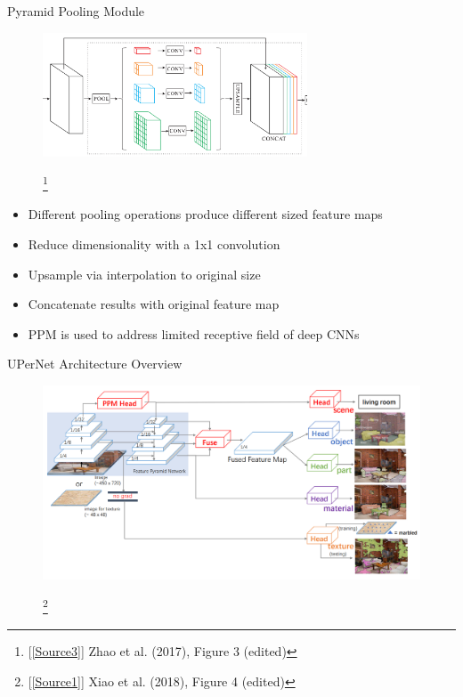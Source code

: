 \documentclass{beamer}
\newcommand\blfootnote[1]{
  \begingroup
  \renewcommand\thefootnote{}\footnote{#1}
  \addtocounter{footnote}{-1}
  \endgroup
}
\begin{document}

\begin{frame}{Pyramid Pooling Module}
    \begin{figure}
        \centering
        \includegraphics[width=0.7\textwidth]{Images/PPMModuleOverview.png}
        \blfootnote{[\ref{Source3}] Zhao et al. (2017), Figure 3 (edited)}
    \end{figure}
    \vspace{-0.5cm}
    \begin{itemize}
        \item Different pooling operations produce different sized feature maps
        \item Reduce dimensionality with a 1x1 convolution
        \item Upsample via interpolation to original size
        \item Concatenate results with original feature map
        \item PPM is used to address limited receptive field of deep CNNs
    \end{itemize}
\end{frame}


\begin{frame}{UPerNet Architecture Overview}
    \begin{figure}
        \centering
        \includegraphics[width=\textwidth]{Images/UPerNetArchitectureOverview_noHeads.png}
        \blfootnote{[\ref{Source1}] Xiao et al. (2018), Figure 4 (edited)}
    \end{figure}
\end{frame}
\end{document}
